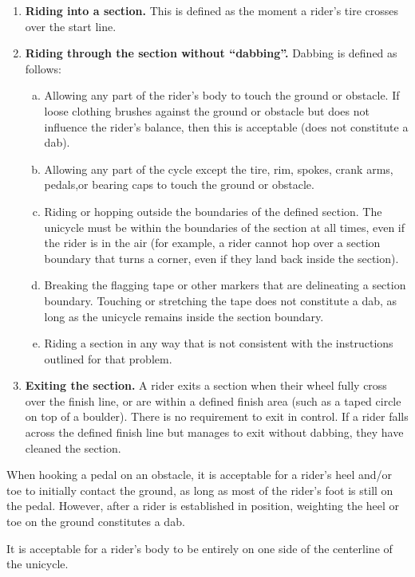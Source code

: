 \begin{enumerate}
\item \textbf{Riding into a section.} This is defined as the moment a rider's tire crosses over the start line.
\item \textbf{Riding through the section without ``dabbing''.} Dabbing is defined as follows:
	\begin{enumerate}[a.]
	\item Allowing any part of the rider's body to touch the ground or obstacle.
	If loose clothing brushes against the ground or obstacle but does not influence the rider's balance, then this is acceptable (does not constitute a dab).
	\item Allowing any part of the cycle except the tire, rim, spokes, crank arms, pedals,or bearing caps to touch the ground or obstacle.
	\item Riding or hopping outside the boundaries of the defined section.
	The unicycle must be within the boundaries of the section at all times, even if the rider is in the air (for example, a rider cannot hop over a section boundary that turns a corner, even if they land back inside the section).
	\item Breaking the flagging tape or other markers that are delineating a section boundary.
	Touching or stretching the tape does not constitute a dab, as long as the unicycle remains inside the section boundary.
	\item Riding a section in any way that is not consistent with the instructions outlined for that problem.
	\end{enumerate}
\item \textbf{Exiting the section.} A rider exits a section when their wheel fully cross over the finish line, or are within a defined finish area (such as a taped circle on top of a boulder).
There is no requirement to exit in control.
If a rider falls across the defined finish line but manages to exit without dabbing, they have cleaned the section.%
\end{enumerate}

When hooking a pedal on an obstacle, it is acceptable for a rider's heel and/or toe to initially contact the ground, as long as most of the rider's foot is still on the pedal.
However, after a rider is established in position, weighting the heel or toe on the ground constitutes a dab.

It is acceptable for a rider's body to be entirely on one side of the centerline of the unicycle.

